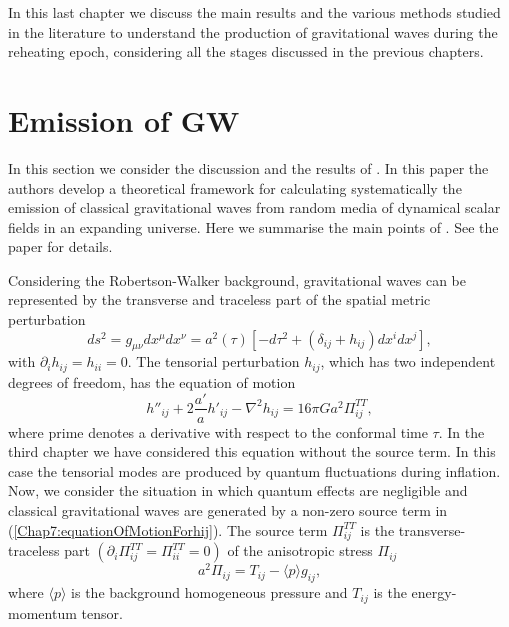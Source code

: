 \documentclass[11pt,a4paper,twoside]{book}
\begin{document}
 In this last chapter we discuss the main results and the various methods studied in the literature to understand the production of gravitational waves during the reheating epoch, considering all the stages discussed in the previous chapters.

\section{Emission of GW}
In this section we consider the discussion and the results of \cite{Chap7:GreenMethod}. In this paper the authors develop  a theoretical framework for calculating systematically the emission of classical gravitational waves from random media of dynamical scalar fields in an expanding universe. Here we summarise the main points of \cite{Chap7:GreenMethod}. See the paper for details. 

Considering the Robertson-Walker background, gravitational waves can be represented by the transverse and traceless part of the spatial metric perturbation
\begin{equation}
\label{Chap7:metricPerturbation}
ds^{2}=g_{\mu\nu}dx^{\mu}dx^{\nu} = a^{2}(\tau)[-d\tau^{2} + (\delta_{ij} + h_{ij})dx^{i}dx^{j}],
\end{equation}
with $ \partial_{i}h_{ij}=h_{ii}=0 $. The tensorial perturbation $ h_{ij} $, which has two independent degrees of freedom, has the equation of motion
\begin{equation}
\label{Chap7:equationOfMotionForhij}
h''_{ij} + 2\frac{a'}{a}h'_{ij} - \nabla^{2}h_{ij} = 16\pi G a^{2} \Pi^{TT}_{ij},
\end{equation}
where  prime denotes a derivative with respect to the conformal time $\tau$. In the third chapter we have considered this equation without the source term. In this case the tensorial modes are produced by quantum fluctuations during inflation. Now, we consider the situation in which quantum effects are negligible and classical gravitational waves are generated by a non-zero source term in (\ref{Chap7:equationOfMotionForhij}). The source term $\Pi^{TT}_{ij}$ is the transverse-traceless part $ (\partial_{i}\Pi^{TT}_{ij} = \Pi^{TT}_{ii} = 0) $ of the anisotropic stress $ \Pi_{ij} $
\begin{equation}
\label{Chap7:anisotropicStress}
a^{2}\Pi_{ij}=T_{ij}-\langle p\rangle g_{ij},
\end{equation}
where $ \langle p\rangle  $ is the background homogeneous pressure and $ T_{ij} $ is the energy-momentum tensor. 
\end{document}
